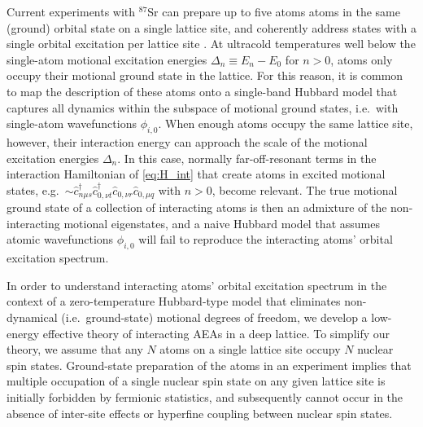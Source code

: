 \documentclass[preprint,showkeys,nofootinbib]{revtex4-1}
\renewcommand{\c}{\hat{c}}
\newcommand{\1}{\mathds{1}}
\begin{document}
Current experiments with ${}^{87}$Sr can prepare up to five atoms
atoms in the same (ground) orbital state on a single lattice site, and
coherently address states with a single orbital excitation per lattice
site \cite{goban2018emergence}.  At ultracold temperatures well below
the single-atom motional excitation energies $\Delta_n\equiv E_n-E_0$
for $n>0$, atoms only occupy their motional ground state in the
lattice.  For this reason, it is common to map the description of
these atoms onto a single-band Hubbard model that captures all
dynamics within the subspace of motional ground states, i.e.~with
single-atom wavefunctions $\phi_{i,0}$.  When enough atoms occupy the
same lattice site, however, their interaction energy can approach the
scale of the motional excitation energies $\Delta_n$.  In this case,
normally far-off-resonant terms in the interaction Hamiltonian of
\eqref{eq:H_int} that create atoms in excited motional states,
e.g.~$\sim\c_{n\mu s}^\dag \c_{0,\nu t}^\dag \c_{0,\nu r} \c_{0,\mu
  q}$ with $n>0$, become relevant.  The true motional ground state of
a collection of interacting atoms is then an admixture of the
non-interacting motional eigenstates, and a naive Hubbard model that
assumes atomic wavefunctions $\phi_{i,0}$ will fail to reproduce the
interacting atoms' orbital excitation spectrum.

In order to understand interacting atoms' orbital excitation spectrum
in the context of a zero-temperature Hubbard-type model that
eliminates non-dynamical (i.e.~ground-state) motional degrees of
freedom, we develop a low-energy effective theory of interacting AEAs
in a deep lattice.  To simplify our theory, we assume that any $N$
atoms on a single lattice site occupy $N$ nuclear spin states.
Ground-state preparation of the atoms in an experiment implies that
multiple occupation of a single nuclear spin state on any given
lattice site is initially forbidden by fermionic statistics, and
subsequently cannot occur in the absence of inter-site effects or
hyperfine coupling between nuclear spin states.
\end{document}
